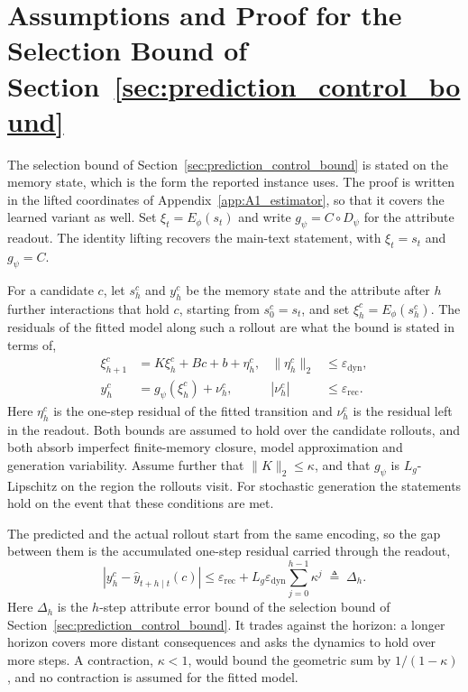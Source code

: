 \section{Assumptions and Proof for the Selection Bound of Section~\ref{sec:prediction_control_bound}}
\label{app:A6_selection_bound}

The selection bound of Section~\ref{sec:prediction_control_bound} is stated on the memory state, which is the
form the reported instance uses. The proof is written in the lifted
coordinates of Appendix~\ref{app:A1_estimator}, so that it covers the learned
variant as well. Set $\xi_t=E_{\phi}(s_t)$ and write $g_{\psi}=C\circ D_{\psi}$
for the attribute readout. The identity lifting recovers the main-text
statement, with $\xi_t=s_t$ and $g_{\psi}=C$.

For a candidate $c$, let $s_h^c$ and $y_h^c$ be the memory state and the
attribute after $h$ further interactions that hold $c$, starting from
$s_0^c=s_t$, and set $\xi_h^c=E_{\phi}(s_h^c)$. The residuals of the fitted
model along such a rollout are what the bound is stated in terms of,
\begin{equation}
    \begin{aligned}
        \xi_{h+1}^c
        &=K\xi_h^c+Bc+b+\eta_h^c,
        &
        \|\eta_h^c\|_2
        &\leq\varepsilon_{\mathrm{dyn}},\\
        y_h^c
        &=g_{\psi}(\xi_h^c)+\nu_h^c,
        &
        |\nu_h^c|
        &\leq\varepsilon_{\mathrm{rec}}.
    \end{aligned}
    \label{eq:residual_assumptions}
\end{equation}
Here $\eta_h^c$ is the one-step residual of the fitted transition and
$\nu_h^c$ is the residual left in the readout. Both bounds are assumed to hold
over the candidate rollouts, and both absorb imperfect finite-memory closure,
model approximation and generation variability. Assume further that
$\|K\|_2\leq\kappa$, and that $g_{\psi}$ is $L_g$-Lipschitz on the region the
rollouts visit. For stochastic generation the statements hold on the event
that these conditions are met.

The predicted and the actual rollout start from the same encoding, so the gap
between them is the accumulated one-step residual carried through the readout,
\begin{equation}
    \left|
        y_h^c-\widehat{y}_{t+h\mid t}(c)
    \right|
    \leq
    \varepsilon_{\mathrm{rec}}
    +
    L_g\varepsilon_{\mathrm{dyn}}
    \sum_{j=0}^{h-1}\kappa^j
    \;\triangleq\;\Delta_h .
    \label{eq:prediction_bound_full}
\end{equation}
Here $\Delta_h$ is the $h$-step attribute error bound of
the selection bound of Section~\ref{sec:prediction_control_bound}. It trades against the horizon: a longer
horizon covers more distant consequences and asks the dynamics to hold over
more steps. A contraction, $\kappa<1$, would bound the geometric sum by
$1/(1-\kappa)$, and no contraction is assumed for the fitted model.

